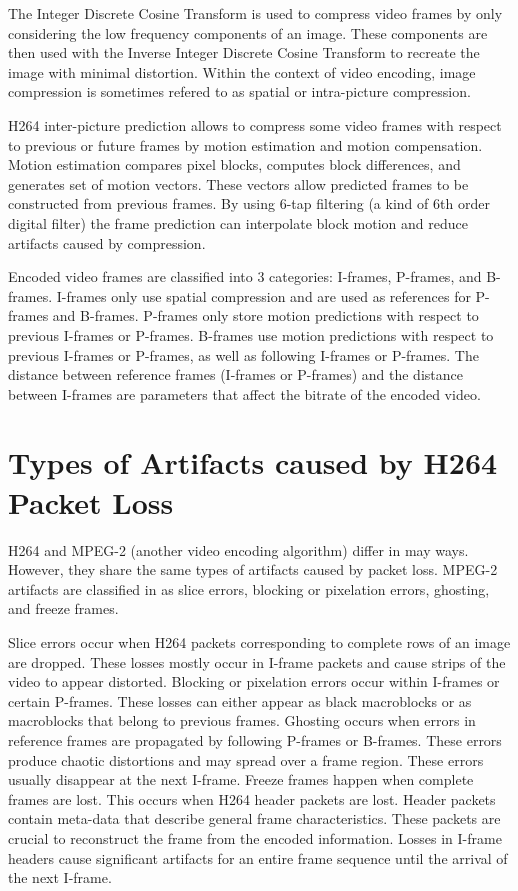 
The Integer Discrete Cosine Transform is used to compress video frames by only considering the low frequency components of an image. These components are then used with the Inverse Integer Discrete Cosine Transform to recreate the image with minimal distortion. Within the context of video encoding, image compression is sometimes refered to as spatial or intra-picture compression.

H264 inter-picture prediction allows to compress some video frames with respect to previous or future frames by motion estimation and motion compensation. Motion estimation compares pixel blocks, computes block differences, and generates set of motion vectors. These vectors allow predicted frames to be constructed from previous frames. By using 6-tap filtering (a kind of 6th order digital filter) the frame prediction can interpolate block motion and reduce artifacts caused by compression.

Encoded video frames are classified into 3 categories: I-frames, P-frames, and B-frames. I-frames only use spatial compression and are used as references for P-frames and B-frames. P-frames only store motion predictions with respect to previous I-frames or P-frames. B-frames use motion predictions with respect to previous I-frames or P-frames, as well as following I-frames or P-frames. The distance between reference frames (I-frames or P-frames) and the distance between I-frames are parameters that affect the bitrate of the encoded video.


\section{Types of Artifacts caused by H264 Packet Loss}
\label{sec:h264_pl}

H264 and MPEG-2 (another video encoding algorithm) differ in may ways. However, they share the same types of artifacts caused by packet loss. MPEG-2 artifacts are classified in \cite{Greengrass2009} as slice errors, blocking or pixelation errors, ghosting, and freeze frames.

Slice errors occur when H264 packets corresponding to complete rows of an image are dropped. These losses mostly occur in I-frame packets and cause strips of the video to appear distorted. Blocking or pixelation errors occur within I-frames or certain P-frames. These losses can either appear as black macroblocks or as macroblocks that belong to previous frames. Ghosting occurs when errors in reference frames are propagated by following P-frames or B-frames. These errors produce chaotic distortions and may spread over a frame region. These errors usually disappear at the next I-frame. Freeze frames happen when complete frames are lost. This occurs when H264 header packets are lost. Header packets contain meta-data that describe general frame characteristics. These packets are crucial to reconstruct the frame from the encoded information. Losses in I-frame headers cause significant artifacts for an entire frame sequence until the arrival of the next I-frame.

